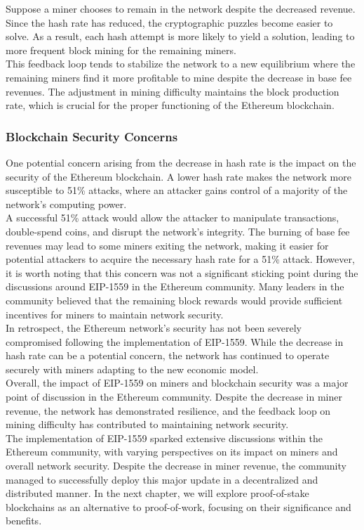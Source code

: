 Suppose a miner chooses to remain in the network despite the decreased revenue. Since the hash rate has reduced, the cryptographic puzzles become easier to solve. As a result, each hash attempt is more likely to yield a solution, leading to more frequent block mining for the remaining miners.\\
This feedback loop tends to stabilize the network to a new equilibrium where the remaining miners find it more profitable to mine despite the decrease in base fee revenues. The adjustment in mining difficulty maintains the block production rate, which is crucial for the proper functioning of the Ethereum blockchain.

\subsubsection{Blockchain Security Concerns}
One potential concern arising from the decrease in hash rate is the impact on the security of the Ethereum blockchain. A lower hash rate makes the network more susceptible to 51\% attacks, where an attacker gains control of a majority of the network's computing power.\\
A successful 51\% attack would allow the attacker to manipulate transactions, double-spend coins, and disrupt the network's integrity. The burning of base fee revenues may lead to some miners exiting the network, making it easier for potential attackers to acquire the necessary hash rate for a 51\% attack. However, it is worth noting that this concern was not a significant sticking point during the discussions around EIP-1559 in the Ethereum community. Many leaders in the community believed that the remaining block rewards would provide sufficient incentives for miners to maintain network security.\\

In retrospect, the Ethereum network's security has not been severely compromised following the implementation of EIP-1559. While the decrease in hash rate can be a potential concern, the network has continued to operate securely with miners adapting to the new economic model.\\

Overall, the impact of EIP-1559 on miners and blockchain security was a major point of discussion in the Ethereum community. Despite the decrease in miner revenue, the network has demonstrated resilience, and the feedback loop on mining difficulty has contributed to maintaining network security.\\

The implementation of EIP-1559 sparked extensive discussions within the Ethereum community, with varying perspectives on its impact on miners and overall network security. Despite the decrease in miner revenue, the community managed to successfully deploy this major update in a decentralized and distributed manner. In the next chapter, we will explore proof-of-stake blockchains as an alternative to proof-of-work, focusing on their significance and benefits.
